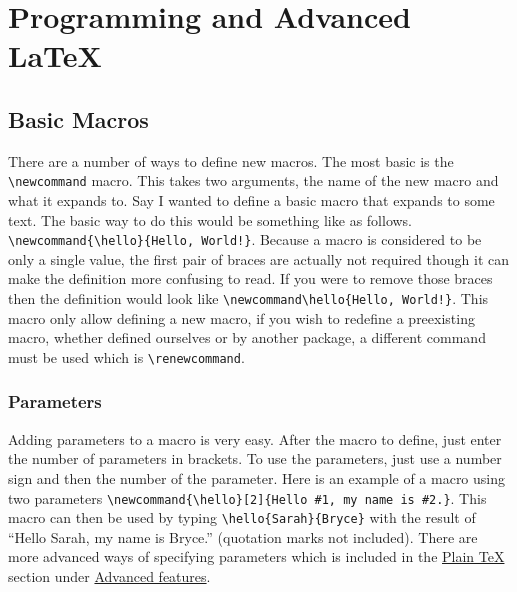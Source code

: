 \section{Programming and Advanced LaTeX}

\subsection{Basic Macros}
There are a number of ways to define new macros. The most basic is the \verb=\newcommand= macro. This takes two arguments, the name of the new macro and what it expands to. Say I wanted to define a basic macro that expands to some text. The basic way to do this would be something like as follows. \verb=\newcommand{\hello}{Hello, World!}=. Because a macro is considered to be only a single value, the first pair of braces are actually not required though it can make the definition more confusing to read. If you were to remove those braces then the definition would look like \verb=\newcommand\hello{Hello, World!}=. This macro only allow defining a new macro, if you wish to redefine a preexisting macro, whether defined ourselves or by another package, a different command must be used which is \verb=\renewcommand=.
\subsubsection{Parameters}
Adding parameters to a macro is very easy. After the macro to define, just enter the number of parameters in brackets. To use the parameters, just use a number sign and then the number of the parameter. Here is an example of a macro using two parameters \verb=\newcommand{\hello}[2]{Hello #1, my name is #2.}=. This macro can then be used by typing \verb=\hello{Sarah}{Bryce}= with the result of \newcommand{\hello}[2]{Hello #1, my name is #2.}``\hello{Sarah}{Bryce}'' (quotation marks not included). There are more advanced ways of specifying parameters which is included in the \hyperref[section:programming/advancedFeatures/plainTeX]{Plain \TeX{}} section under \hyperref[section:programming/advancedFeatures]{Advanced features}.
